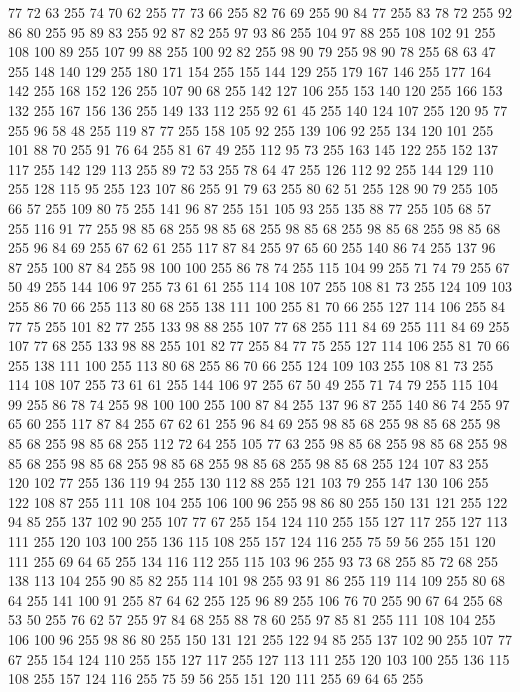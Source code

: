 77 72 63 255 74 70 62 255 77 73 66 255 82 76 69 255 90 84 77 255 83 78 72 255 92 86 80 255 95 89 83 255 92 87 82 255 97 93 86 255 104 97 88 255 108 102 91 255 108 100 89 255 107 99 88 255 100 92 82 255 98 90 79 255 98 90 78 255 68 63 47 255 148 140 129 255 180 171 154 255 155 144 129 255 179 167 146 255 177 164 142 255 168 152 126 255 107 90 68 255 142 127 106 255 153 140 120 255 166 153 132 255 167 156 136 255 149 133 112 255 92 61 45 255 140 124 107 255 120 95 77 255 96 58 48 255 119 87 77 255 158 105 92 255 139 106 92 255 134 120 101 255 101 88 70 255 91 76 64 255 81 67 49 255 112 95 73 255 163 145 122 255 152 137 117 255 142 129 113 255 89 72 53 255 78 64 47 255 126 112 92 255 144 129 110 255 128 115 95 255 123 107 86 255 91 79 63 255 80 62 51 255 128 90 79 255 105 66 57 255 109 80 75 255 141 96 87 255 151 105 93 255 135 88 77 255 105 68 57 255 116 91 77 255 98 85 68 255 98 85 68 255 98 85 68 255
98 85 68 255 98 85 68 255 96 84 69 255 67 62 61 255 117 87 84 255 97 65 60 255 140 86 74 255 137 96 87 255 100 87 84 255 98 100 100 255 86 78 74 255 115 104 99 255 71 74 79 255 67 50 49 255 144 106 97 255 73 61 61 255 114 108 107 255 108 81 73 255 124 109 103 255 86 70 66 255 113 80 68 255 138 111 100 255 81 70 66 255 127 114 106 255 84 77 75 255 101 82 77 255 133 98 88 255 107 77 68 255 111 84 69 255 111 84 69 255 107 77 68 255 133 98 88 255 101 82 77 255 84 77 75 255 127 114 106 255 81 70 66 255 138 111 100 255 113 80 68 255 86 70 66 255 124 109 103 255 108 81 73 255 114 108 107 255 73 61 61 255 144 106 97 255 67 50 49 255 71 74 79 255 115 104 99 255 86 78 74 255 98 100 100 255 100 87 84 255 137 96 87 255 140 86 74 255 97 65 60 255 117 87 84 255 67 62 61 255 96 84 69 255 98 85 68 255 98 85 68 255 98 85 68 255 98 85 68 255 112 72 64 255 105 77 63 255 98 85 68 255 98 85 68 255
98 85 68 255 98 85 68 255 98 85 68 255 98 85 68 255 98 85 68 255 124 107 83 255 120 102 77 255 136 119 94 255 130 112 88 255 121 103 79 255 147 130 106 255 122 108 87 255 111 108 104 255 106 100 96 255 98 86 80 255 150 131 121 255 122 94 85 255 137 102 90 255 107 77 67 255 154 124 110 255 155 127 117 255 127 113 111 255 120 103 100 255 136 115 108 255 157 124 116 255 75 59 56 255 151 120 111 255 69 64 65 255 134 116 112 255 115 103 96 255 93 73 68 255 85 72 68 255 138 113 104 255 90 85 82 255 114 101 98 255 93 91 86 255 119 114 109 255 80 68 64 255 141 100 91 255 87 64 62 255 125 96 89 255 106 76 70 255 90 67 64 255 68 53 50 255 76 62 57 255 97 84 68 255 88 78 60 255 97 85 81 255 111 108 104 255 106 100 96 255 98 86 80 255 150 131 121 255 122 94 85 255 137 102 90 255 107 77 67 255 154 124 110 255 155 127 117 255 127 113 111 255 120 103 100 255 136 115 108 255 157 124 116 255 75 59 56 255 151 120 111 255 69 64 65 255

